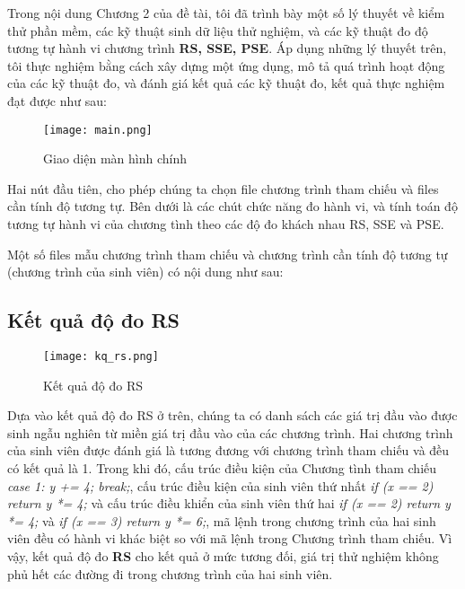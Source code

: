 Trong nội dung Chương 2 của đề tài, tôi đã trình bày một số lý thuyết về kiểm
thử phần mềm, các kỹ thuật sinh dữ liệu thử nghiệm, và các kỹ thuật đo
độ tương tự hành vi chương trình \textbf{RS, SSE, PSE}. Áp dụng những
lý thuyết trên, tôi thực nghiệm bằng cách xây dựng một ứng dụng, mô tả
quá trình hoạt động của các kỹ thuật đo, và đánh giá kết quả các kỹ
thuật đo, kết quả thực nghiệm đạt được như sau:

\begin{center}
  \begin{figure}[H]
    \begin{center}
      \texttt{[image: main.png]}
    \end{center}
    \caption{Giao diện màn hình chính}
  \end{figure}
\end{center}

Hai nút đầu tiên, cho phép chúng ta chọn file chương trình tham chiếu và files cần tính độ tương tự. Bên dưới là các chút chức năng đo hành vi, và tính toán độ tương tự hành vi của chương tình theo các độ đo khách nhau RS, SSE và PSE.

Một số files mẫu chương trình tham chiếu và chương trình cần tính độ tương tự (chương trình của sinh viên) có nội dung như sau:





\subsection{Kết quả độ đo RS}
\begin{center}
  \begin{figure}[H]
    \begin{center}
      \texttt{[image: kq\_rs.png]}
    \end{center}
    \caption{Kết quả độ đo RS}
  \end{figure}
\end{center}

Dựa vào kết quả độ đo RS ở trên, chúng ta có danh sách các giá trị đầu
vào được sinh ngẫu nghiên từ miền giá trị đầu vào của các chương
trình. Hai chương trình của sinh viên được đánh giá là tương đương với
chương trình tham chiếu và đều có kết quả là 1. Trong khi đó, cấu trúc điều
kiện của Chương tình tham chiếu \textit{case 1: y += 4; break;}, cấu trúc điều kiện của sinh viên thứ nhất \textit{if (x == 2) return y *= 4;} và cấu trúc điều khiển của sinh viên thứ hai \textit{if (x == 2) return y *= 4;} và \textit{if (x == 3) return y *= 6;}, mã lệnh trong chương trình của hai sinh viên đều có hành
vi khác biệt so với mã lệnh trong Chương trình tham chiếu. Vì vậy, kết quả độ đo \textbf{RS} cho kết quả ở mức tương đối, giá trị thử nghiệm không phủ hết các đường đi trong chương trình của hai sinh viên.

